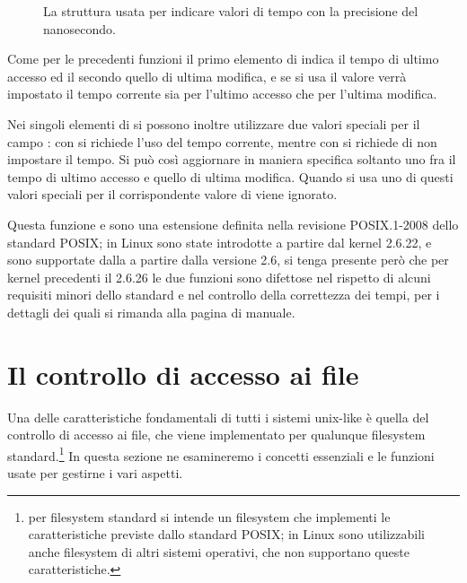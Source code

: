 \begin{figure}[!htb]
  \footnotesize \centering
  \begin{minipage}[c]{0.8\textwidth}
  \end{minipage} 
  \normalsize 
  \caption{La struttura  usata per indicare valori di tempo
    con la precisione del nanosecondo.}
  \label{fig:sys_timespec_struct}
\end{figure}

Come per le precedenti funzioni il primo elemento di  indica il
tempo di ultimo accesso ed il secondo quello di ultima modifica, e se si usa
il valore  verrà impostato il tempo corrente sia per l'ultimo
accesso che per l'ultima modifica.

Nei singoli elementi di  si possono inoltre utilizzare due valori
speciali per il campo : con  si richiede
l'uso del tempo corrente, mentre con  si richiede di non
impostare il tempo. Si può così aggiornare in maniera specifica soltanto uno
fra il tempo di ultimo accesso e quello di ultima modifica. Quando si usa uno
di questi valori speciali per  il corrispondente valore di
 viene ignorato.

Questa funzione e  sono una estensione definita nella
revisione POSIX.1-2008 dello standard POSIX; in Linux sono state introdotte a
partire dal kernel 2.6.22, e sono supportate dalla  a partire dalla
versione 2.6, si tenga presente però che per kernel precedenti il 2.6.26 le
due funzioni sono difettose nel rispetto di alcuni requisiti minori dello
standard e nel controllo della correttezza dei tempi, per i dettagli dei quali
si rimanda alla pagina di manuale.


\section{Il controllo di accesso ai file}
\label{sec:file_access_control}

Una delle caratteristiche fondamentali di tutti i sistemi unix-like è quella
del controllo di accesso ai file, che viene implementato per qualunque
filesystem standard.\footnote{per filesystem standard si intende un filesystem
  che implementi le caratteristiche previste dallo standard POSIX; in Linux
  sono utilizzabili anche filesystem di altri sistemi operativi, che non
  supportano queste caratteristiche.} In questa sezione ne esamineremo i
concetti essenziali e le funzioni usate per gestirne i vari aspetti.


